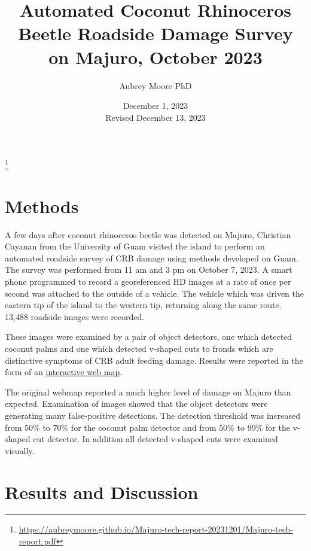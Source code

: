 \documentclass[12pt,letterpaper,english,bibliography=totocnumbered, abstract=on]{scrartcl}
\begin{document}
\titlehead{DRAFT TECHNICAL REPORT}

\title{Automated Coconut Rhinoceros Beetle Roadside Damage Survey on Majuro, October 2023}

\author{Aubrey Moore PhD}

\date{December 1, 2023\\Revised December 13, 2023}

\maketitle

\footnote{\url{https://aubreymoore.github.io/Majuro-tech-report-20231201/Majuro-tech-report.pdf}}


\pagebreak

\section{Methods}

A few days after coconut rhinoceros beetle was detected on Majuro, Christian Cayanan from the University of Guam visited the island to perform an automated roadside survey of CRB damage using methods developed on Guam. The survey was performed from 11 am and 3 pm on October 7, 2023. A smart phone programmed to record a georeferenced HD images at a rate of once per second was attached to the outside of a vehicle. The vehicle which was driven the eastern tip of the island to the western tip, returning along the same route. 13,488 roadside images were recorded.

These images were examined by a pair of object detectors, one which detected coconut palms and one which detected v-shaped cuts to fronds which are distinctive symptoms of CRB adult feeding damage. Results were reported in the form of an \href{https://aubreymoore.github.io/Majuro-CRB-Damage-Map-2023-10/webmap/#12/7.1098/171.2099}{interactive web map}. 

The original webmap reported a much higher level of damage on Majuro than expected. Examination of images showed that the object detectors were generating many false-positive detections. The detection threshold was increased from 50\% to 70\% for the coconut palm detector and from 50\% to 99\% for the v-shaped cut detector. In addition all detected v-shaped cuts were examined visually.

\section{Results and Discussion}
\end{document}

